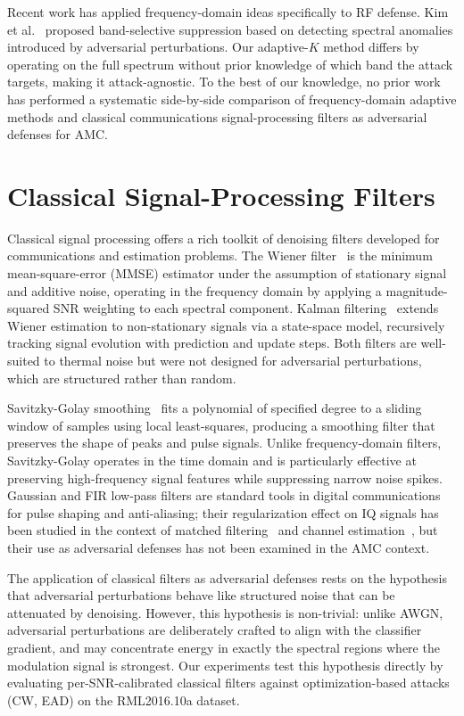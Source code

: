 Recent work has applied frequency-domain ideas specifically to RF defense.
Kim et al.~\cite{kim2024frequency} proposed band-selective suppression based
on detecting spectral anomalies introduced by adversarial perturbations. Our
adaptive-$K$ method differs by operating on the full spectrum without prior
knowledge of which band the attack targets, making it attack-agnostic. To
the best of our knowledge, no prior work has performed a systematic
side-by-side comparison of frequency-domain adaptive methods and classical
communications signal-processing filters as adversarial defenses for AMC.

\section{Classical Signal-Processing Filters}

Classical signal processing offers a rich toolkit of denoising filters
developed for communications and estimation problems. The Wiener
filter~\cite{wiener1949extrapolation} is the minimum mean-square-error
(MMSE) estimator under the assumption of stationary signal and additive
noise, operating in the frequency domain by applying a magnitude-squared
SNR weighting to each spectral component. Kalman
filtering~\cite{kalman1960new} extends Wiener estimation to non-stationary
signals via a state-space model, recursively tracking signal evolution with
prediction and update steps. Both filters are well-suited to thermal noise
but were not designed for adversarial perturbations, which are structured
rather than random.

Savitzky-Golay smoothing~\cite{savitzky1964smoothing} fits a polynomial of
specified degree to a sliding window of samples using local least-squares,
producing a smoothing filter that preserves the shape of peaks and pulse
signals. Unlike frequency-domain filters, Savitzky-Golay operates in the
time domain and is particularly effective at preserving high-frequency signal
features while suppressing narrow noise spikes. Gaussian and FIR low-pass
filters are standard tools in digital communications for pulse shaping and
anti-aliasing; their regularization effect on IQ signals has been studied in
the context of matched filtering~\cite{proakis2008digital} and channel
estimation~\cite{haykin2002adaptive}, but their use as adversarial defenses
has not been examined in the AMC context.

The application of classical filters as adversarial defenses rests on the
hypothesis that adversarial perturbations behave like structured noise that
can be attenuated by denoising. However, this hypothesis is non-trivial:
unlike AWGN, adversarial perturbations are deliberately crafted to align with
the classifier gradient, and may concentrate energy in exactly the spectral
regions where the modulation signal is strongest. Our experiments test this
hypothesis directly by evaluating per-SNR-calibrated classical filters
against optimization-based attacks (CW, EAD) on the RML2016.10a dataset.

